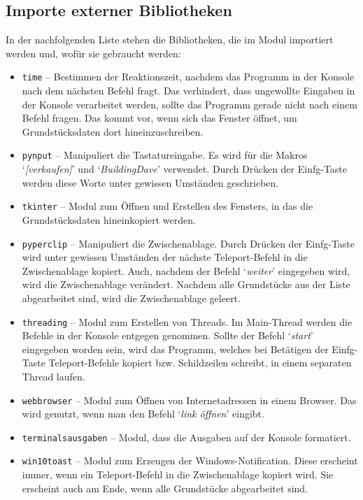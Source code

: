 \documentclass{article}
\begin{document}
\subsection{Importe externer Bibliotheken}
In der nachfolgenden Liste stehen die Bibliotheken, die im Modul importiert werden und, wof\"ur sie gebraucht werden:
\begin{itemize}
	\item \texttt{time} -- Bestimmen der Reaktionszeit, nachdem das Programm in der Konsole nach dem n\"achsten Befehl fragt. Das verhindert, dass ungewollte Eingaben in der Konsole verarbeitet werden, sollte das Programm gerade nicht nach einem Befehl fragen. Das kommt vor, wenn sich das Fenster \"offnet, um Grundst\"ucksdaten dort hineinzuschreiben.
	\item \texttt{pynput} -- Manipuliert die Tastatureingabe. Es wird f\"ur die Makros `\textit{[verkaufen]}' und `\textit{BuildingDave}' verwendet. Durch Dr\"ucken der Einfg-Taste werden diese Worte unter gewissen Umst\"anden geschrieben.
	\item \texttt{tkinter} -- Modul zum \"Offnen und Erstellen des Fensters, in das die Grundst\"ucksdaten hineinkopiert werden.
	\item \texttt{pyperclip} -- Manipuliert die Zwischenablage. Durch Dr\"ucken der Einfg-Taste wird unter gewissen Umst\"anden der n\"achste Teleport-Befehl in die Zwischenablage kopiert. Auch, nachdem der Befehl `\textit{weiter}' eingegeben wird, wird die Zwischenablage ver\"andert. Nachdem alle Grundst\"ucke aus der Liste abgearbeitet sind, wird die Zwischenablage geleert.
	\item \texttt{threading} -- Modul zum Erstellen von Threads. Im Main-Thread werden die Befehle in der Konsole entgegen genommen. Sollte der Befehl `\textit{start}' eingegeben worden sein, wird das Programm, welches bei Bet\"atigen der Einfg-Taste Teleport-Befehle kopiert bzw. Schildzeilen schreibt, in einem separaten Thread laufen.
	\item \texttt{webbrowser} -- Modul zum \"Offnen von Internetadressen in einem Browser. Das wird genutzt, wenn man den Befehl `\textit{link öffnen}' eingibt.
	\item \texttt{terminalsausgaben} -- Modul, dass die Ausgaben auf der Konsole formatiert.
	\item \texttt{win10toast} -- Modul zum Erzeugen der Windows-Notification. Diese erscheint immer, wenn ein Teleport-Befehl in die Zwischenablage kopiert wird. Sie erscheint auch am Ende, wenn alle Grundst\"ucke abgearbeitet sind.\\[22pt]
\end{itemize}
\end{document}
